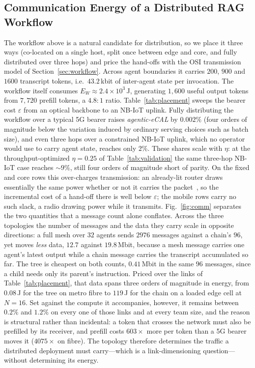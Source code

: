 \documentclass[journal]{IEEEtran}
\newif\ifshowchanges \showchangestrue
\newcommand{\NEW}{\ifshowchanges\color{blue}\fi}
\newcommand{\OLD}{\ifshowchanges\color{black}\fi}
\newcommand{\ROOF}{\ifshowchanges\color{green!45!black}\fi}
\newcommand{\caseEnergy}{\ensuremath{2.4\times10^{3}}}    %
\newcommand{\handoffBits}{$43.2$\,kbit}                 %
\newcommand{\agecal}{\textit{agentic-eCAL}}
\begin{document}
\subsection{Communication Energy of a Distributed RAG Workflow}  \NEW The workflow above is a natural candidate for
distribution, so we place it three ways (co-located on a single host, split once between edge and
core, and fully distributed over three hops) and price the hand-offs with the OSI transmission
model of Section~\ref{sec:workflow}. Across agent boundaries it carries $200$, $900$ and $1600$
transcript tokens, i.e.\ \handoffBits{} of inter-agent state per invocation. \NEW{}The workflow
itself consumes $E_W\approx\caseEnergy$\,J, generating $1{,}600$ useful output tokens from $7{,}720$
prefill tokens, a $4.8{:}1$ ratio.\OLD{} Table~\ref{tab:placement} sweeps the bearer cost $\varepsilon$ from an optical backbone to an NB-IoT uplink. Fully
distributing the workflow over a typical 5G bearer raises \agecal{} by $0.002\%$ (four orders of
magnitude below the variation induced by ordinary serving choices such as batch size), and even
three hops over a constrained NB-IoT uplink, which no operator would use to carry agent state,
reaches only $2\%$. \NEW{}These shares scale with $\eta$: at the throughput-optimized $\eta=0.25$ of
Table~\ref{tab:validation} the same three-hop NB-IoT case reaches $\sim\!9\%$, still four orders of
magnitude short of parity.\OLD{} \NEW{}On the fixed and core rows this over-charges transmission:
an already-lit router draws essentially the same power whether or not it carries the
packet~\cite{jacob2025routers}, so the incremental cost of a hand-off there is well below
$\varepsilon$; the mobile rows carry no such slack, a radio drawing power while it transmits.\OLD{}
\ROOF{}Fig.~\ref{fig:comm} separates the two quantities that a message count alone
conflates. Across the three topologies the number of messages and the data they carry scale in
opposite directions: a full mesh over $32$ agents sends $2976$ messages against a chain's $96$,
yet moves \emph{less} data, $12.7$ against $19.8$\,Mbit, because a mesh message carries one
agent's latest output while a chain message carries the transcript accumulated so far. The tree is
cheapest on both counts, $0.41$\,Mbit in the same $96$ messages, since a child needs only its
parent's instruction. Priced over the links of Table~\ref{tab:placement}, that data spans three
orders of magnitude in energy, from $0.08$\,J for the tree on metro fibre to $119$\,J for the
chain on a loaded edge cell at $N=16$. Set against the compute it accompanies, however, it remains
between $0.2\%$ and $1.2\%$ on every one of those links and at every team size, and the reason is
structural rather than incidental: a token that crosses the network must also be prefilled by its
receiver, and prefill costs $603\times$ more per token than a 5G bearer moves it ($4075\times$ on
fibre). The topology therefore determines the traffic a distributed deployment must carry---which
is a link-dimensioning question---without determining its energy.\OLD{}
\end{document}
